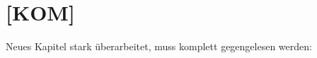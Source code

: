 \documentclass[
ngerman,
paper=a4,
asymmetric,
fontsize=10pt,
draft=false,
numbers=noenddot,
bibtotocnumbered,
footnotes=multiple,
]{scrreprt}
\newcommand{\jALT}{\vspace{6pt}\noindent{\color{red}\sffamily\textbf{DELETED}\hrulefill\newline}}
\newcommand{\jALTende}{\newline{\color{red}\rule{\linewidth}{2pt}\newline}}
\newcommand{\jNEU}{\vspace{6pt}\noindent{\color{green}\sffamily\textbf{ADDED}\hrulefill\newline}}
\newcommand{\jNEUende}{\newline{\color{green}\rule{\linewidth}{3pt}\newline}}
\begin{document}
% 
% 
% 

\section{[KOM]}

Neues Kapitel stark überarbeitet, muss komplett gegengelesen
werden:
\end{document}
